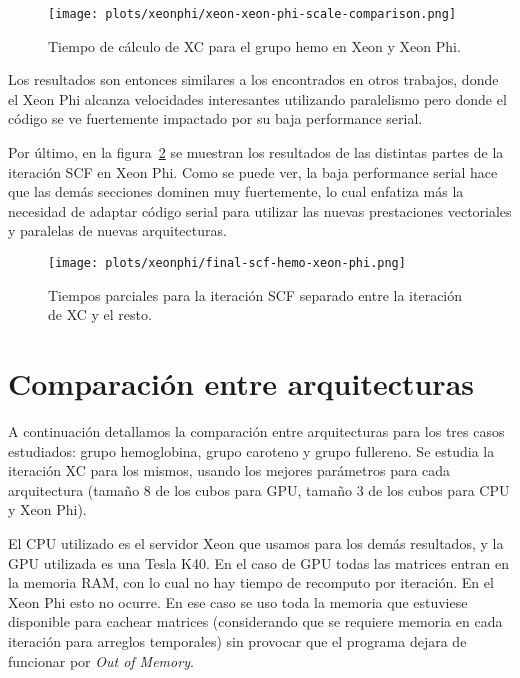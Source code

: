 \begin{figure}[htbp]
   \centering
   \texttt{[image: plots/xeonphi/xeon-xeon-phi-scale-comparison.png]}
   \caption{Tiempo de c\'alculo de XC para el grupo hemo en Xeon y Xeon Phi.}
   \label{fig:xeon-xeon-phi-parallelized-iteration}
\end{figure}

Los resultados son entonces similares a los encontrados en otros trabajos,
donde el Xeon Phi alcanza velocidades interesantes utilizando paralelismo
pero donde el c\'odigo se ve fuertemente impactado por su baja performance serial.

Por \'ultimo, en la figura~\ref{fig:group-times-scf-xeon-phi} se muestran los resultados
de las distintas partes de la iteraci\'on SCF en Xeon Phi. Como se puede ver, la baja performance
serial hace que las dem\'as secciones dominen muy fuertemente, lo cual enfatiza m\'as la necesidad
de adaptar c\'odigo serial para utilizar las nuevas prestaciones vectoriales y paralelas de nuevas
arquitecturas.

\begin{figure}[htbp]
   \centering
   \texttt{[image: plots/xeonphi/final-scf-hemo-xeon-phi.png]}
   \caption{Tiempos parciales para la iteraci\'on SCF separado entre la iteraci\'on de XC y el resto.}
   \label{fig:group-times-scf-xeon-phi}
\end{figure}

\section{Comparaci\'on entre arquitecturas}

A continuaci\'on detallamos la comparaci\'on entre arquitecturas para los tres
casos estudiados: grupo hemoglobina, grupo caroteno y grupo fullereno. Se estudia
la iteraci\'on XC para los mismos, usando los mejores par\'ametros para cada
arquitectura (tama\~no 8 de los cubos para GPU, tama\~no 3 de los cubos para CPU
y Xeon Phi).

El CPU utilizado es el servidor Xeon que usamos para los dem\'as resultados, y
la GPU utilizada es una Tesla K40. En el caso de GPU todas las matrices entran
en la memoria RAM, con lo cual no hay tiempo de recomputo por iteraci\'on. En el
Xeon Phi esto no ocurre. En ese caso se uso toda la memoria que estuviese
disponible para cachear matrices (considerando que se requiere memoria en cada
iteraci\'on para arreglos temporales) sin provocar que el programa dejara de
funcionar por \textit{Out of Memory}.

